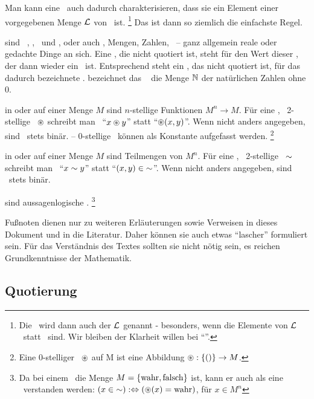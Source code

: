 \begin{description}
	Man kann eine \Formel\ auch dadurch charakterisieren, dass sie ein Element einer vorgegebenen Menge $\mathcal{L}$ von \Zeichenfolgen\ ist.%
	\footnote{%
		Die \Formel\ wird dann auch  der  $\mathcal{L}$ genannt - besonders, wenn die Elemente von $\mathcal{L}$ \Zeichenketten\ statt \Zeichenfolgen\ sind.
		Wir bleiben der Klarheit willen bei \enquote{\Formel}.
	}
	Das ist dann so ziemlich die einfachste Regel.
	\item[\Objekte] sind \textzB\ \Symbole, \Zeichenketten, \Zeichenfolgen\ und \Formeln, oder auch \Aussagen, Mengen, Zahlen, \textusw\ -- ganz allgemein reale oder gedachte Dinge an sich.
	Eine \Formel, die nicht quotiert ist, steht für den Wert dieser \Formel, der dann wieder ein \Objekt\ ist.
	Entsprechend steht ein \Symbol, das nicht quotiert ist, für das dadurch bezeichnete \Objekt.
	\textZB bezeichnet das \Symbol\ \chrqt{$\gsN$} die Menge $\gsN$ der natürlichen Zahlen ohne 0.
	\item[\Operationen] in oder auf einer Menge $M$ sind $n$-stellige Funktionen $M^n \rightarrow M$.
	Für eine , \textdh\ 2-stellige \Operation\ $\circledast$ schreibt man \textiAlg\ \enquote{$x \circledast y$} statt \enquote{$\circledast(x,y)$}.
	Wenn nicht anders angegeben, sind \Operationen\ stets binär.
	-- 0-stellige \Operationen\ können als Konstante aufgefasst werden.%
	\footnote{%
		Eine 0-stelliger \Operation\ $\circledast$ auf M ist eine Abbildung $\circledast : \{()\} \rightarrow M$.
	}
	\item[\Relationen] in oder auf einer Menge $M$ sind Teilmengen von $M^n$.
	Für eine , \textdh\ 2-stellige \Relation\ $\sim$ schreibt man \textiAlg\ \enquote{$x \sim y$} statt \enquote{$(x,y) \in\; \sim$}.
	Wenn nicht anders angegeben, sind \Relationen\ stets binär.
	\item[\Junktoren] sind aussagenlogische \Operationen.%
	\footnote{%
		Da bei einem \Junktor\ die Menge $M = \{\mathrm{wahr},\mathrm{falsch}\}$ ist, kann er auch als eine \Relation\ verstanden werden:
		\newline $(x \in\; \sim) :\Leftrightarrow (\circledast(x) = \mathrm{wahr})$, für $x \in M^n$
	}
\end{description}

Fußnoten dienen nur zu weiteren Erläuterungen sowie Verweisen in dieses Dokument und in die Literatur.
Daher können sie auch etwas \enquote{lascher} formuliert sein.
Für das Verständnis des Textes sollten sie nicht nötig sein, es reichen
Grundkenntnisse der Mathematik.

\subsection{Quotierung}%
\label{sub:Quotierung}

